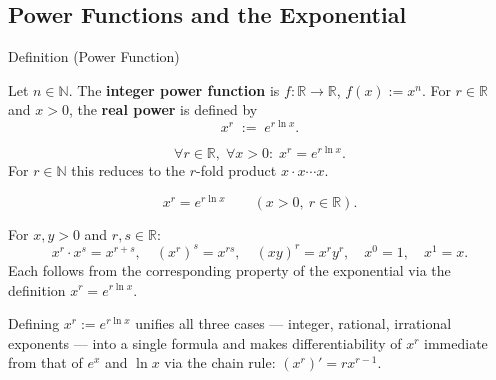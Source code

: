 
\subsection*{Power Functions and the Exponential}
\label{sec:power-exponential}


\begin{definitionbox}{Definition (Power Function)}
\begin{definition}
\label{def:power-function}
Let $n \in \mathbb{N}$. The \textbf{integer power function} is
$f : \mathbb{R} \to \mathbb{R}$, $f(x) := x^n$. For $r \in \mathbb{R}$
and $x > 0$, the \textbf{real power} is defined by
\[
  x^r \;:=\; e^{r \ln x}.
\]
\end{definition}
\end{definitionbox}

\begin{remark*}
\[
  \forall r \in \mathbb{R},\; \forall x > 0 :\; x^r = e^{r\ln x}.
\]
For $r \in \mathbb{N}$ this reduces to the $r$-fold product
$x \cdot x \cdots x$.
\end{remark*}

\begin{remark*}
\[
  x^r=e^{r\ln x}
  \qquad (x>0,\ r\in\mathbb{R}).
\]
\end{remark*}

\begin{remark*}[Interpretation]
For $x, y > 0$ and $r, s \in \mathbb{R}$:
\[
  x^r \cdot x^s = x^{r+s}, \quad
  (x^r)^s = x^{rs}, \quad
  (xy)^r = x^r y^r, \quad
  x^0 = 1, \quad
  x^1 = x.
\]
Each follows from the corresponding property of the exponential via
the definition $x^r = e^{r\ln x}$.


Defining $x^r := e^{r\ln x}$ unifies all three cases --- integer,
rational, irrational exponents --- into a single formula and makes
differentiability of $x^r$ immediate from that of $e^x$ and $\ln x$
via the chain rule: $(x^r)' = rx^{r-1}$.
\end{remark*}

